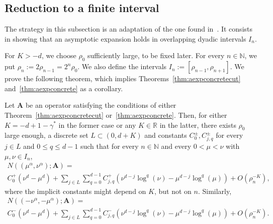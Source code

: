 \documentclass[AHL,Unicode,longabstracts,published]{cedram}
\newcommand{\R}{\mathbb R}
\newcommand{\N}{\mathbb N}
\newcommand{\BA}{\mathbf A}
\newcommand{\bigo}[1]{O\left(#1 \right)}
\begin{document}
\subsection{Reduction to a finite interval}

The strategy in this subsection is an adaptation of the one found in~\cite{MorParSht2014,ParSht2012}. It consists in showing that an asymptotic expansion holds in overlapping dyadic intervals $I_n$.

For $K > -d$, we choose $\rho_0$ sufficiently large, to be fixed later. For every $n \in \N$, we put $\rho_n := 2 \rho_{n-1} = 2^n \rho_0$. We also define the intervals $I_n := [\rho_{n-1},\rho_{n+1}]$. We prove the following theorem, which implies Theorems~\ref{thm:aexpconcretecut} and~\ref{thm:aexpconcrete} as a corollary.
\begin{theo} \label{thm:ainint}
Let $\BA$ be an operator satisfying the conditions of either Theorem~\ref{thm:aexpconcretecut} or~\ref{thm:aexpconcrete}. Then, for either $K = -d + 1 - \gamma^*$ in the former case or any $K \in \R$ in the latter, there exists $\rho_0$ large enough, a discrete set $L \subset (0,d+K)$ and constants $C_0^\pm, C^\pm_{j,q}$ for every $j \in L$ and $0
\le q \le d-1$ such that for every $n \in \N$ and every $0 < \mu < \nu$ with $\mu, \nu \in I_n$,
\begin{multline}\label{eq:ainint}
N((\mu^\alpha,\nu^\alpha);\BA) =\\
C_0^+(\nu^d - \mu^d) +
\sum_{j\in L}\sum_{q =0}^{d-1} C_{j,q}^+
\left(\nu^{d-j} \log^q(\nu) - \mu^{d-j} \log^q(\mu)\right) + \bigo{\rho_n^{-K}},
\end{multline}
where the implicit constants might depend on $K$, but not on $n$. Similarly,
\begin{multline}\label{eq:ainintneg}
N((-\nu^\alpha,-\mu^\alpha);\BA) =\\
 C_0^- (\nu^d - \mu^d) +
\sum_{j\in L}\sum_{q =0}^{d-1} C_{j,q}^-
\left(\nu^{d-j} \log^q(\nu) - \mu^{d-j} \log^q(\mu)\right) +
\bigo{\rho_n^{-K}}.
\end{multline}
\end{theo}
\end{document}

